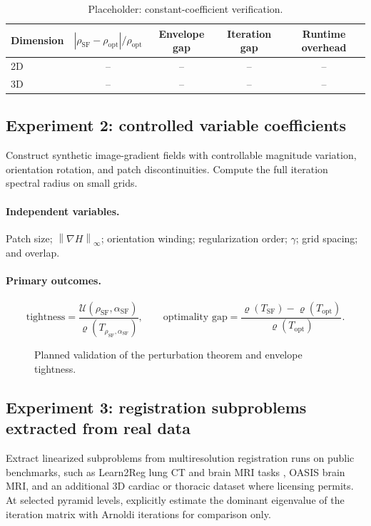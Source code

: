 \documentclass[11pt]{article}
\theoremstyle{definition}
\newcommand{\norm}[1]{\left\lVert #1\right\rVert}
\newcommand{\spr}{\varrho}
\begin{document}
\begin{table}[h]
\centering
\caption{Placeholder: constant-coefficient verification.}
\begin{tabular}{lcccc}
\toprule
Dimension & $|\rho_{\mathrm{SF}}-\rho_{\mathrm{opt}}|/\rho_{\mathrm{opt}}$ & Envelope gap & Iteration gap & Runtime overhead\\
\midrule
2D & -- & -- & -- & --\\
3D & -- & -- & -- & --\\
\bottomrule
\end{tabular}
\end{table}

\subsection{Experiment 2: controlled variable coefficients}
Construct synthetic image-gradient fields with controllable magnitude variation, orientation rotation, and patch discontinuities. Compute the full iteration spectral radius on small grids.

\paragraph{Independent variables.}
Patch size; $\norm{\nabla H}_\infty$; orientation winding; regularization order; $\gamma$; grid spacing; and overlap.

\paragraph{Primary outcomes.}
\[
\text{tightness}=
\frac{\mathcal U(\rho_{\mathrm{SF}},\alpha_{\mathrm{SF}})}
{\spr(T_{\rho_{\mathrm{SF}},\alpha_{\mathrm{SF}}})},
\qquad
\text{optimality gap}=
\frac{\spr(T_{\mathrm{SF}})-\spr(T_{\mathrm{opt}})}{\spr(T_{\mathrm{opt}})}.
\]

\begin{figure}[h]
\centering
{}
\caption{Planned validation of the perturbation theorem and envelope tightness.}
\end{figure}

\subsection{Experiment 3: registration subproblems extracted from real data}
Extract linearized subproblems from multiresolution registration runs on public benchmarks, such as Learn2Reg lung CT and brain MRI tasks \cite{Hering2022}, OASIS brain MRI, and an additional 3D cardiac or thoracic dataset where licensing permits. At selected pyramid levels, explicitly estimate the dominant eigenvalue of the iteration matrix with Arnoldi iterations for comparison only.
\end{document}

